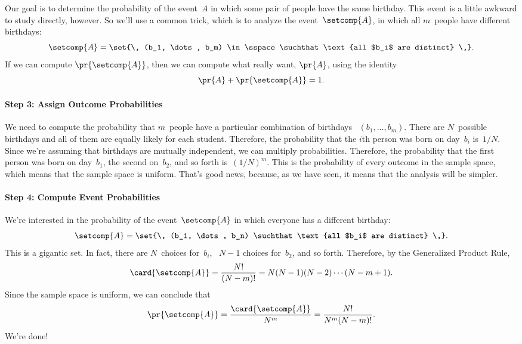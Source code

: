 Our goal is to determine the probability of the event~$A$ in which
some pair of people have the same birthday.  This event is a little
awkward to study directly, however.  So we'll use a common trick,
which is to analyze the  event~$\setcomp{A}$, in
which all $m$~people have different birthdays:
\begin{equation*}
    \setcomp{A} = \set{\, (b_1, \dots, b_m) \in \sspace
                    \suchthat \text{all $b_i$ are distinct} \,}.
\end{equation*}
If we can compute $\pr{\setcomp{A}}$, then we can compute what
really want, $\pr{A}$, using the identity
\begin{equation*}
    \pr{A} + \pr{\setcomp{A}} = 1.
\end{equation*}

\paragraph{Step 3: Assign Outcome Probabilities}

We need to compute the probability that $m$~people have a particular
combination of birthdays ~$(b_1, \dots, b_m)$.  There are $N$~possible
birthdays and all of them are equally likely for each student.
Therefore, the probability that the $i$th person was born on day~$b_i$
is~$1/N$.  Since we're assuming that birthdays are mutually
independent, we can multiply probabilities.  Therefore, the
probability that the first person was born on day~$b_1$, the second
on~$b_2$, and so forth is~$(1/N)^m$.  This is the probability of every
outcome in the sample space, which means that the sample space is
uniform.  That's good news, because, as we have seen, it means that
the analysis will be simpler.

\paragraph{Step 4: Compute Event Probabilities}

We're interested in the probability of the event~$\setcomp{A}$ in
which everyone has a different birthday:
\begin{equation*}
    \setcomp{A} = \set{\, (b_1, \dots, b_n) \suchthat
                            \text{all $b_i$ are distinct} \,}.
\end{equation*}
This is a gigantic set.  In fact, there are $N$~choices for~$b_i$,
\ $N - 1$ choices for~$b_2$, and so forth.  Therefore, by the
Generalized Product Rule,
\begin{equation*}
\card{\setcomp{A}}
    = \frac{N!}{(N - m)!}
    = N (N - 1) (N - 2) \cdots (N - m + 1).
\end{equation*}
Since the sample space is uniform, we can conclude that
\begin{equation}\label{eqn:15E4}
\pr{\setcomp{A}}
    = \frac{\card{\setcomp{A}}}{N^m} \\
    = \frac{N!}{N^m (N - m)!}.
\end{equation}
We're done!

